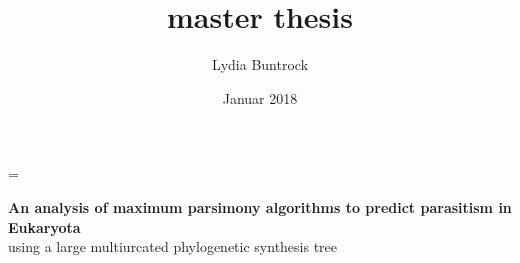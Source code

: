 
\author{Lydia Buntrock}
\title{master thesis}
\date{Januar 2018}

\hfuzz=\maxdimen {} 



  \begin{titlepage}
    \pagestyle{empty}
  	
    	\vspace{20mm}
    	\begin{Large}
          \textbf{An analysis of maximum parsimony algorithms to predict parasitism in Eukaryota}\\
          using a large multiurcated phylogenetic synthesis tree
      \end{Large}

  	\clearpage
  \end{titlepage}

